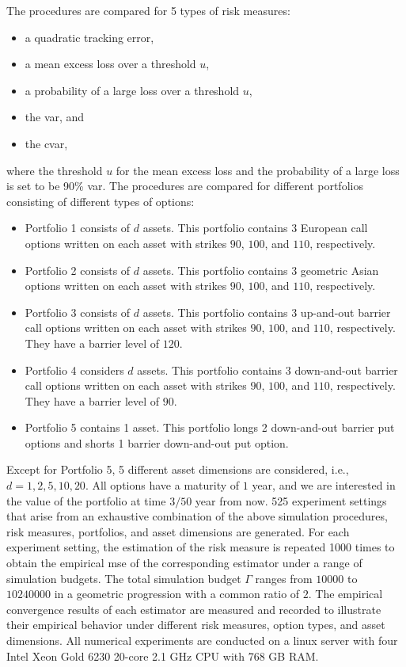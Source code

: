 The procedures are compared for 5 types of risk measures:
\begin{itemize}
    \item a quadratic tracking error,
    \item a mean excess loss over a threshold $u$,
    \item a probability of a large loss over a threshold $u$,
    \item the \gls{var}, and
    \item the \gls{cvar},
\end{itemize}
where the threshold $u$ for the mean excess loss and the probability of a large loss is set to be 90\% \gls{var}.
The procedures are compared for different portfolios consisting of different types of options:
\begin{itemize}
    \item   Portfolio 1 consists of $d$ assets.
    This portfolio contains 3 European call options written on each asset with strikes $90$, $100$, and $110$, respectively. 
    \item   Portfolio 2 consists of $d$ assets.
    This portfolio contains 3 geometric Asian options written on each asset with strikes $90$, $100$, and $110$, respectively. 
    \item   Portfolio 3 consists of $d$ assets.
    This portfolio contains 3 up-and-out barrier call options written on each asset with strikes $90$, $100$, and $110$, respectively. They have a barrier level of $120$.
    \item   Portfolio 4 considers $d$ assets.
    This portfolio contains 3 down-and-out barrier call options written on each asset with strikes $90$, $100$, and $110$, respectively. They have a barrier level of $90$.
    \item   Portfolio 5 contains 1 asset.
    This portfolio longs 2 down-and-out barrier put options and shorts 1 barrier down-and-out put option. 
\end{itemize}
Except for Portfolio 5, 5 different asset dimensions are considered, i.e., $d = 1, 2, 5, 10, 20$.
All options have a maturity of $1$ year, and we are interested in the value of the portfolio at time $3/50$ year from now.
525 experiment settings that arise from an exhaustive combination of the above simulation procedures, risk measures, portfolios, and asset dimensions are generated.
For each experiment setting, the estimation of the risk measure is repeated \num{1000} times to obtain the empirical \gls{mse} of the corresponding estimator under a range of simulation budgets.
The total simulation budget $\Gamma$ ranges from $\num{10000}$ to $\num{10240000}$ in a geometric progression with a common ratio of $2$.
The empirical convergence results of each estimator are measured and recorded to illustrate their empirical behavior under different risk measures, option types, and asset dimensions.
All numerical experiments are conducted on a linux server with four Intel Xeon Gold 6230 20-core 2.1 GHz CPU with 768 GB RAM.

